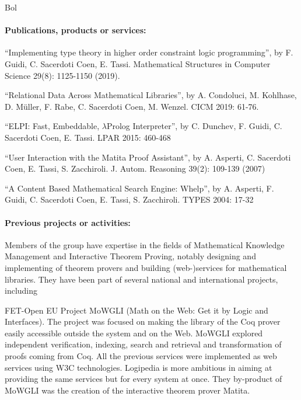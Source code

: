 \begin{sitedescription}{Bol}
\paragraph*{Publications, products or services:}

\begin{compactitem}
\item ``Implementing type theory in higher order constraint logic programming'', by F. Guidi, C. Sacerdoti Coen, E. Tassi. Mathematical Structures in Computer Science 29(8): 1125-1150 (2019).
\item ``Relational Data Across Mathematical Libraries'', by A. Condoluci, M. Kohlhase, D. Müller, F. Rabe, C. Sacerdoti Coen, M. Wenzel. CICM 2019: 61-76.
\item ``ELPI: Fast, Embeddable, $\lambda$Prolog Interpreter'', by C. Dunchev, F. Guidi, C. Sacerdoti Coen, E. Tassi. LPAR 2015: 460-468
\item ``User Interaction with the Matita Proof Assistant'', by A. Asperti, C. Sacerdoti Coen, E. Tassi, S. Zacchiroli. J. Autom. Reasoning 39(2): 109-139 (2007)
\item ``A Content Based Mathematical Search Engine: Whelp'', by A. Asperti, F. Guidi, C. Sacerdoti Coen, E. Tassi, S. Zacchiroli. TYPES 2004: 17-32
\end{compactitem}

\paragraph*{Previous projects or activities:}

Members of the group have expertise in the fields of Mathematical Knowledge Management and Interactive Theorem Proving, notably designing and implementing of theorem provers and building (web-)services for mathematical libraries.
They have been part of several national and international projects, including

\begin{compactitem}
\item FET-Open EU Project MoWGLI (Math on the Web: Get it by Logic and Interfaces). The project was focused on making the library of the Coq prover easily accessible outside the system and on the Web. MoWGLI explored independent verification, indexing, search and retrieval and transformation of proofs coming from Coq. All the previous services were implemented as web services using W3C technologies. Logipedia is more ambitious in aiming at providing the same services but for every system at once. They by-product of MoWGLI was the creation of the interactive theorem prover Matita.


\end{compactitem}
\end{sitedescription}
